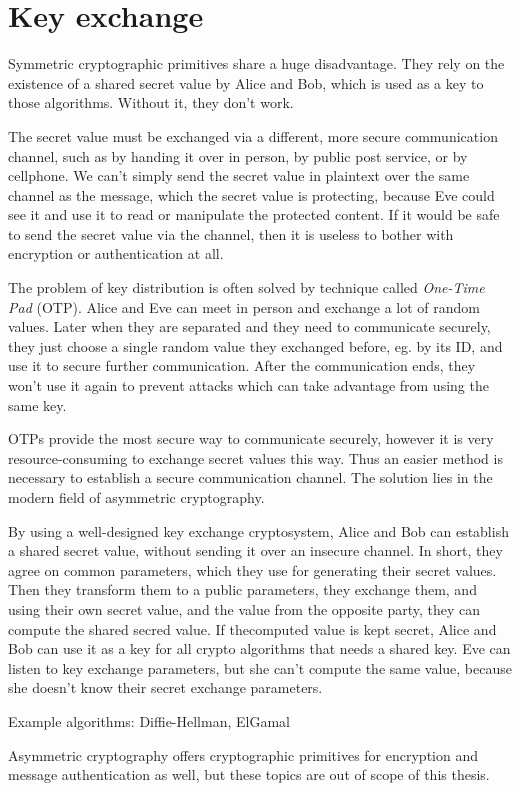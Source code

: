 \section{Key exchange}
\label{toc/key-exchange}

Symmetric cryptographic primitives share a huge disadvantage. They rely on the existence of a shared secret value by Alice and Bob, which is used as a key to those algorithms. Without it, they don't work.

The secret value must be exchanged via a different, more secure communication channel, such as by handing it over in person, by public post service, or by cellphone. We can't simply send the secret value in plaintext over the same channel as the message, which the secret value is protecting, because Eve could see it and use it to read or manipulate the protected content. If it would be safe to send the secret value via the channel, then it is useless to bother with encryption or authentication at all.

The problem of key distribution is often solved by technique called \textit{One-Time Pad} (OTP). Alice and Eve can meet in person and exchange a lot of random values. Later when they are separated and they need to communicate securely, they just choose a single random value they exchanged before, eg. by its ID, and use it to secure further communication. After the communication ends, they won't use it again to prevent attacks which can take advantage from using the same key.

OTPs provide the most secure way to communicate securely, however it is very resource-consuming to exchange secret values this way. Thus an easier method is necessary to establish a secure communication channel. The solution lies in the modern field of asymmetric cryptography.

By using a well-designed key exchange cryptosystem, Alice and Bob can establish a shared secret value, without sending it over an insecure channel. In short, they agree on common parameters, which they use for generating their secret values. Then they transform them to a public parameters, they exchange them, and using their own secret value, and the value from the opposite party, they can compute the shared secred value. If thecomputed value is kept secret, Alice and Bob can use it as a key for all crypto algorithms that needs a shared key. Eve can listen to key exchange parameters, but she can't compute the same value, because she doesn't know their secret exchange parameters.

Example algorithms: Diffie-Hellman, ElGamal

Asymmetric cryptography offers cryptographic primitives for encryption and message authentication as well, but these topics are out of scope of this thesis.
